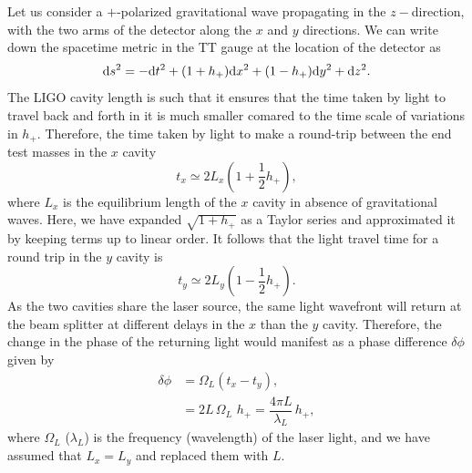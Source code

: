 Let us consider a $+$-polarized gravitational wave propagating in the 
$z-$direction, with the two arms of the detector along the $x$ and $y$ directions.
We can write down the spacetime metric in the TT gauge at the
location of the detector as
%
\begin{equation}
 \mathrm{d} s^2 = -\mathrm{d} t^2 + (1+h_+)\mathrm{d} x^2 + (1-h_+)\mathrm{d} y^2 + \mathrm{d} z^2.
\end{equation}
% 
The LIGO 
cavity length is such that it ensures that the time taken by light to travel 
back and forth in it is much smaller comared to the time scale of variations in
$h_+$. Therefore, the time taken by light to make a round-trip between the end
test masses in the $x$ cavity 
% 
\begin{equation}
 t_x \simeq 2L_x (1 + \frac{1}{2}h_+),
\end{equation}
% 
where $L_x$ is the equilibrium length of the $x$ cavity in absence of 
gravitational waves. Here, we have expanded $\sqrt{1+h_+}$ as a Taylor series
and approximated it by keeping terms up to linear order. 
It follows that the light travel time for a round trip in 
the $y$ cavity is
% 
\begin{equation}
 t_y \simeq 2L_y (1 - \frac{1}{2}h_+).
\end{equation}
% 
As the two cavities share the laser source, the same light wavefront will 
return at the beam splitter at different delays in the $x$ than the $y$ cavity. 
Therefore, the change in the phase of the returning light would manifest as a 
phase difference $\delta\phi$ given by
% 
\begin{align}
 \delta\phi &= \Omega_L (t_x - t_y), \\ \nonumber
 &= 2 L\, \Omega_L\,\, h_+ = \dfrac{4\pi L}{\lambda_L}\,h_+,
\end{align}
where $\Omega_L$ ($\lambda_L$) is the frequency (wavelength) of the laser 
light, and we have assumed that $L_x = L_y$ and replaced them with $L$. 



